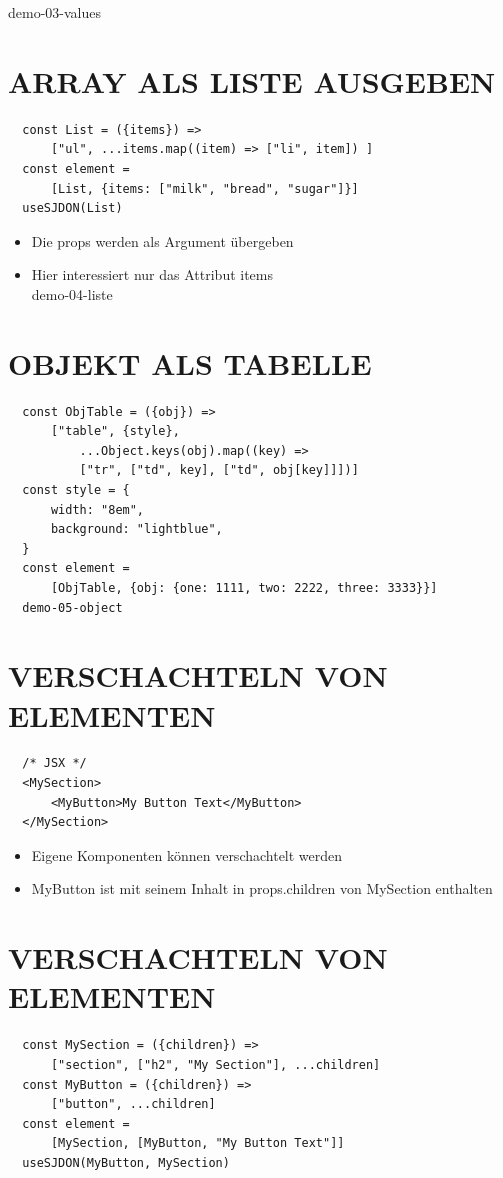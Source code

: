   demo-03-values
  
  \section*{ARRAY ALS LISTE AUSGEBEN}
  \begin{verbatim}
  const List = ({items}) =>
      ["ul", ...items.map((item) => ["li", item]) ]
  const element =
      [List, {items: ["milk", "bread", "sugar"]}]
  useSJDON(List)
  \end{verbatim}
  
  \begin{itemize}
    \item Die props werden als Argument übergeben
    \item Hier interessiert nur das Attribut items\\
  demo-04-liste
  \end{itemize}
  
  \section*{OBJEKT ALS TABELLE}
  \begin{verbatim}
  const ObjTable = ({obj}) =>
      ["table", {style},
          ...Object.keys(obj).map((key) =>
          ["tr", ["td", key], ["td", obj[key]]])]
  const style = {
      width: "8em",
      background: "lightblue",
  }
  const element =
      [ObjTable, {obj: {one: 1111, two: 2222, three: 3333}}]
  demo-05-object
  \end{verbatim}
  
  \section*{VERSCHACHTELN VON ELEMENTEN}
  \begin{verbatim}
  /* JSX */
  <MySection>
      <MyButton>My Button Text</MyButton>
  </MySection>
  \end{verbatim}
  
  \begin{itemize}
    \item Eigene Komponenten können verschachtelt werden
    \item MyButton ist mit seinem Inhalt in props.children von MySection enthalten
  \end{itemize}
  
  \section*{VERSCHACHTELN VON ELEMENTEN}
  \begin{verbatim}
  const MySection = ({children}) =>
      ["section", ["h2", "My Section"], ...children]
  const MyButton = ({children}) =>
      ["button", ...children]
  const element =
      [MySection, [MyButton, "My Button Text"]]
  useSJDON(MyButton, MySection)
  \end{verbatim}
  
